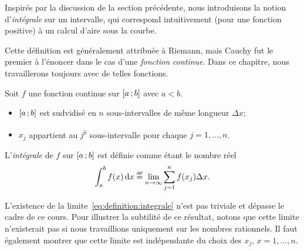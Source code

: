 \documentclass[main.tex]{subfiles}
\begin{document}
Inspirés par la discussion de la section précédente,
nous introduisons la notion d'\emph{intégrale} sur un intervalle,
qui correspond intuitivement (pour une fonction positive) à un calcul d'aire sous la courbe.

Cette définition est généralement attribuée à Riemann,
mais Cauchy fut le premier à l'énoncer dans le cas d'une \emph{fonction continue}.
Dans ce chapitre,
nous travaillerons toujours avec de telles fonctions.

\begin{definition}

    Soit $f$ une fonction continue sur $\mathopen{[}a\,;b\mathclose{]}$ avec $a < b$.

    \begin{itemize}
        \item $\mathopen{[}a\,;b\mathclose{]}$ est sudvidisé en $n$ sous-intervalles de même longueur $\Delta x$;
        \item $x_j$ appartient au $j$\textsuperscript{è} sous-intervalle pour chaque $j = 1, \dots, n$.
    \end{itemize}

    L'\emph{intégrale} de $f$ sur $\mathopen{[}a\,;b\mathclose{]}$ est définie comme étant le nombre réel
    \begin{align}
        \int_a^b f(x) \dd x \defeq \lim_{n \to \infty} \sum_{j = 1}^n f(x_j) \Delta x.
        \label{eq:definition:integrale}
    \end{align}
\end{definition}

\begin{remark}

    L'existence de la limite~\eqref{eq:definition:integrale} n'est pas triviale et dépasse le cadre de ce cours.
    Pour illustrer la subtilité de ce résultat,
    notons que cette limite n'existerait pas si nous travaillions uniquement sur les nombres rationnels.
    Il faut également montrer que cette limite est indépendante du choix des $x_j$, $x = 1, \dots, n$.
\end{remark}
\end{document}
